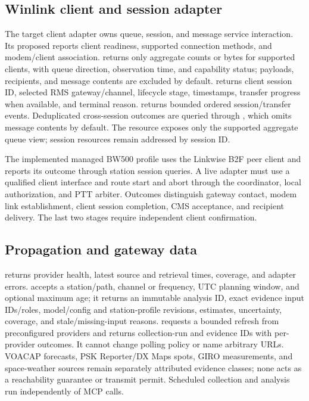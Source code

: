 \documentclass[11pt,a4paper]{article}
\begin{document}
\subsection{Winlink client and session adapter}
The target client adapter owns queue, session, and message service
interaction. Its proposed 
reports client readiness, supported connection methods, and modem/client
association.  returns only aggregate counts
or bytes for supported clients, with queue direction, observation time, and
capability status; payloads, recipients, and message contents are excluded
by default.  returns client session ID, selected
RMS gateway/channel, lifecycle stage, timestamps, transfer progress when
available, and terminal reason.  returns bounded
ordered session/transfer events. Deduplicated cross-session outcomes are
queried through , which omits message contents by
default. The  resource exposes only
the supported aggregate queue view; session resources remain addressed by
session ID.

The implemented managed BW500 profile uses the Linkwise B2F peer client
and reports its outcome through station session queries. A live adapter
must use a qualified client interface and route start and abort through
the coordinator, local authorization, and PTT arbiter. Outcomes distinguish
gateway contact, modem link establishment, client session completion, CMS
acceptance, and recipient delivery. The last two stages require independent
client confirmation.

\subsection{Propagation and gateway data}
 returns provider health, latest source and
retrieval times, coverage, and adapter errors.
 accepts a station/path, channel or
frequency, UTC planning window, and optional maximum age; it returns an
immutable analysis ID, exact evidence input IDs/roles, model/config and
station-profile revisions, estimates, uncertainty, coverage, and
stale/missing-input reasons.  requests a
bounded refresh from preconfigured providers and returns collection-run and
evidence IDs with per-provider outcomes. It cannot change polling policy or
name arbitrary URLs. VOACAP forecasts, PSK Reporter/DX Maps spots, GIRO
measurements, and space-weather sources remain separately attributed
evidence classes; none acts as a reachability guarantee or transmit permit.
Scheduled collection and analysis run independently of MCP calls.
\end{document}
